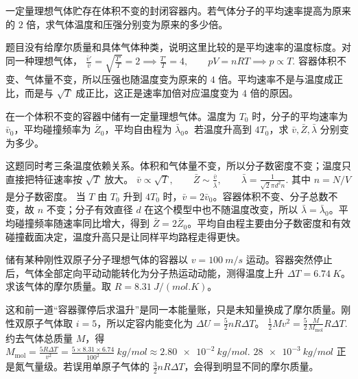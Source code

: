 \documentclass[lang=cn,11pt]{elegantbook}
\begin{document}
\begin{exercise}
一定量理想气体贮存在体积不变的封闭容器内。若气体分子的平均速率提高为原来的 \(2\) 倍，求气体温度和压强分别变为原来的多少倍。
\end{exercise}

\begin{solution}
题目没有给摩尔质量和具体气体种类，说明这里比较的是平均速率的温度标度。对同一种理想气体，
 \(\frac{\bar v'}{\bar v}=\sqrt{\frac{T'}{T}}=2 \implies \frac{T'}{T}=4,\qquad pV=nRT\implies p\propto T.\) 
容器体积不变、气体量不变，所以压强也随温度变为原来的 \(4\) 倍。平均速率不是与温度成正比，而是与 \(\sqrt{T}\) 成正比，这正是速率加倍对应温度变为 \(4\) 倍的原因。
\end{solution}

\begin{exercise}
在一个体积不变的容器中储有一定量理想气体。温度为 \(T_0\) 时，分子的平均速率为 \(\bar v_0\)，平均碰撞频率为 \(\bar Z_0\)，平均自由程为 \(\bar\lambda_0\)。若温度升高到 \(4T_0\)，求 \(\bar v,\bar Z,\bar\lambda\) 分别变为多少。
\end{exercise}

\begin{solution}
这题同时考三条温度依赖关系。体积和气体量不变，所以分子数密度不变；温度只直接把特征速率按 \(\sqrt{T}\) 放大。
 \(\bar v\propto\sqrt{T},\qquad \bar Z\sim \frac{\bar v}{\bar\lambda},\qquad \bar\lambda=\frac{1}{\sqrt2\pi d^2 n}.\) 
其中 \(n=N/V\) 是分子数密度。
当 \(T\) 由 \(T_0\) 升到 \(4T_0\) 时，\(\bar v=2\bar v_0\)。容器体积不变、分子总数不变，故 \(n\) 不变；分子有效直径 \(d\) 在这个模型中也不随温度改变，所以 \(\bar\lambda=\bar\lambda_0\)。平均碰撞频率随速率同比增大，得到 \(\bar Z=2\bar Z_0\)。平均自由程主要由分子数密度和有效碰撞截面决定，温度升高只是让同样平均路程走得更快。
\end{solution}

\begin{exercise}[由骤停温升反推刚性双原子气体摩尔质量]
储有某种刚性双原子分子理想气体的容器以 \(v=\SI{100}{m/s}\) 运动。容器突然停止后，气体全部定向平动动能转化为分子热运动动能，测得温度上升 \(\Delta T=\SI{6.74}{K}\)。求该气体的摩尔质量。取 \(R=\SI{8.31}{J/(mol.K)}\)。
\end{exercise}

\begin{solution}
这和前一道“容器骤停后求温升”是同一本能量账，只是未知量换成了摩尔质量。刚性双原子气体取 \(i=5\)，所以定容内能变化为 \(\Delta U=\frac52 nR\Delta T\)。
 \(\frac12 Mv^2=\frac52\frac{M}{M_{\mathrm{mol}}}R\Delta T.\) 
约去气体总质量 \(M\)，得
 \(M_{\mathrm{mol}} =\frac{5R\Delta T}{v^2} =\frac{5\times 8.31\times 6.74}{100^2}\ \si{kg/mol} \approx \SI{2.80e-2}{kg/mol}.\) 
\(\SI{28e-3}{kg/mol}\) 正是氮气量级。若误用单原子气体的 \(\frac32 nR\Delta T\)，会得到明显不同的摩尔质量。
\end{solution}
\end{document}
